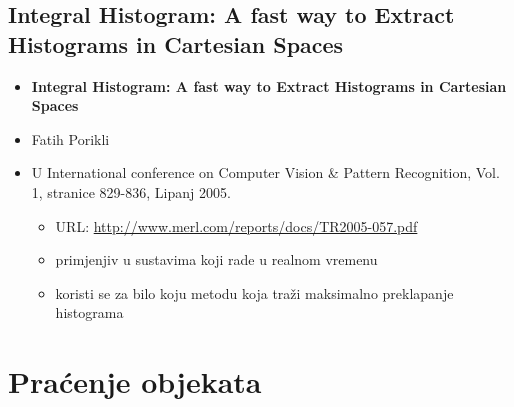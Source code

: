\documentclass[times, utf8, seminar, numeric]{fer}
\begin{document}
\subsection{Integral Histogram: A fast way to Extract Histograms in Cartesian Spaces}
\begin{itemize}
\item \textbf{Integral Histogram: A fast way to Extract Histograms in Cartesian Spaces}
\item Fatih Porikli
\item U International conference on Computer Vision \& Pattern Recognition, Vol. 1, stranice 829-836, Lipanj 2005. 
	\begin{itemize}
		\item URL: \url{http://www.merl.com/reports/docs/TR2005-057.pdf}
		\item primjenjiv u sustavima koji rade u realnom vremenu
		\item koristi se za bilo koju metodu koja traži maksimalno preklapanje histograma
	\end{itemize}
\end{itemize}

\section{Praćenje objekata}
\end{document}
